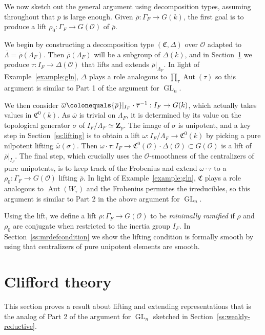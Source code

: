 \documentclass[11pt, letterpaper,english]{amsart}
\theoremstyle{plain}
\theoremstyle{definition}
\numberwithin{equation}{section}
\numberwithin{lem}{section}
\newcommand{\mathfont}{\mathbf}
\newcommand{\Z}{\mathfont Z}
\newcommand{\fC}{\mathfrak{C}}
\newcommand{\cO}{\mathcal{O}}
\DeclareMathOperator{\Aut}{Aut}
\newcommand{\rhobar}{{\overline{\rho}}}
\newcommand{\taubar}{{\overline{\tau}}}
\newcommand{\omegabar}{{\overline{\omega}}}
\DeclareMathOperator{\GL}{GL}
\newcommand{\Ld}{\Lambda}
\newcommand{\Lbar}{\overline{\Lambda}}
\begin{document}
We now sketch out the general argument using decomposition types, assuming throughout that $p$ is large enough.  Given $\rhobar : \Gamma_F \to G(k)$, the first goal is to produce a lift $\rho_0 : \Gamma_F \to G(\cO)$ of $\rhobar$.  

We begin by constructing a decomposition type $(\fC,\Delta)$ over $\cO$ adapted to $\Lbar = \rhobar(\Ld_F)$.  Then $\rhobar(\Lambda_F)$ will be a subgroup of $\Delta(k)$, and in Section~\ref{sec:clifford} we produce $\tau: I_F \to \Delta(\cO)$ that lifts and extends $\rhobar|_{\Lambda_F}$.  
In light of Example~\ref{example:gln}, $\Delta$ plays a role analogous to $\prod_\tau \Aut(\tau)$ so this argument is similar to Part 1 of the argument for $\GL_n$.  

We then consider $\omegabar \colonequals \rhobar|_{I_F} \cdot \taubar^{-1} : I_F \to G(k)$, which actually takes values in $\fC^0(k)$.  As $\omegabar$ is trivial on $\Lambda_F$,  it is determined by its value on the topological generator $\sigma$ of $I_F / \Lambda_F \simeq \Z_p$.  The image of $\sigma$ is unipotent, and a key step in Section~\ref{ss:lifting} is to obtain a lift $\omega : I_F/\Lambda_F \to \fC^0(k)$ by picking a pure nilpotent lifting $\omegabar(\sigma)$.  Then $\omega \cdot \tau : I_F \to \fC^0(\cO) \cdot \Delta(\cO) \subset G(\cO)$ is a lift of $\rhobar|_{I_F}$.  The final step, which crucially uses the $\cO$-smoothness of the centralizers of pure unipotents, is to keep track of the Frobenius and extend $\omega \cdot \tau$ to a $\rho_0 : \Gamma_F \to G(\cO)$ lifting $\rhobar$.  In light of Example~\ref{example:gln}, $\fC$ plays a role analogous to $\Aut(W_\tau)$ and the Frobenius permutes the irreducibles, so this argument is similar to Part 2 in the above argument for $\GL_n$.

Using the lift, we define a lift $\rho : \Gamma_F \to G(\cO)$ to be \textit{minimally ramified} if $\rho$ and $\rho_0$ are conjugate when restricted to the inertia group $I_F$. In Section~\ref{ss:mrdefcondition} we show the lifting condition is formally smooth by using that centralizers of pure unipotent elements are smooth.
\fi 

\section{Clifford theory} \label{sec:clifford}

This section proves a result about lifting and extending representations that is the analog of Part 2 of the argument for $\GL_n$ sketched in Section~\ref{ss:weakly-reductive}.
\end{document}
